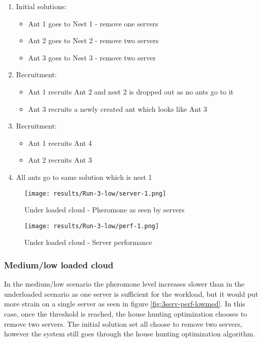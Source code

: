 \begin{enumerate}
	\item Initial solutions: 
	\begin{itemize}
		\item Ant 1 goes to Nest 1 - remove one servers
		\item Ant 2 goes to Nest 2 - remove two servers
		\item Ant 3 goes to Nest 3 - remove two server
	\end{itemize}
	\item Recruitment:
	\begin{itemize}
		\item Ant 1 recruits Ant 2 and nest 2 is dropped out as no ants go to it
		\item Ant 3 recruits a newly created ant which looks like Ant 3
	\end{itemize}
	\item Recruitment:
	\begin{itemize}
		\item Ant 1 recruits Ant 4
		\item Ant 2 recruits Ant 3
	\end{itemize}
	\item All ants go to same solution which is nest 1
\end{enumerate}

\begin{figure}
	\centering
		\texttt{[image: results/Run-3-low/server-1.png]}
	\caption{Under loaded cloud - Pheromone as seen by servers}
	\label{fig:3serv-pher-low}
\end{figure}

\begin{figure}
	\centering
		\texttt{[image: results/Run-3-low/perf-1.png]}
	\caption{Under loaded cloud - Server performance}
	\label{fig:3serv-perf-low}
\end{figure}

\subsubsection{Medium/low loaded cloud}

In the medium/low scenario the pheromone level increases slower than in the underloaded scenario as one server is sufficient for the workload, but it would put more strain on a single server as seen in figure \ref{fig:3serv-perf-lowmed}. In this case, once the threshold is reached, the house hunting optimization chooses to remove two servers. The initial solution set all choose to remove two servers, however the system still goes through the house hunting optimization algorithm.

